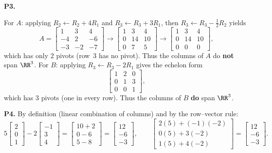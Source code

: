 \documentclass[10pt]{scrartcl}
\begin{document}
\begin{prob}\textbf{P3.}\par{}
\begin{steps}
  \ii For $A$: applying $R_2\leftarrow R_2+4R_1$ and $R_3\leftarrow R_3+3R_1$, then $R_3\leftarrow R_3-\tfrac12R_2$ yields
  \[
    A = \begin{bmatrix}1&3&4\\-4&2&-6\\-3&-2&-7\end{bmatrix}
    \to \begin{bmatrix}1&3&4\\0&14&10\\0&7&5\end{bmatrix}
    \to \begin{bmatrix}1&3&4\\0&14&10\\0&0&0\end{bmatrix},
  \]
  which has only $2$ pivots (row~3 has no pivot). Thus the columns of $A$ do \textbf{not} span $\RR^3$.
  \ii For $B$: applying $R_3\leftarrow R_3-2R_1$ gives the echelon form
  \[
    \begin{bmatrix}1&2&0\\0&1&3\\0&0&1\end{bmatrix},
  \]
  which has $3$ pivots (one in every row). Thus the columns of $B$ \textbf{do} span $\RR^3$.
\end{steps}
\end{prob}

\begin{prob}\textbf{P4.}
By definition (linear combination of columns) and by the row--vector rule:
\[
  5\begin{bmatrix}2\\0\\1\end{bmatrix}-2\begin{bmatrix}-1\\3\\4\end{bmatrix}=\begin{bmatrix}10+2\\0-6\\5-8\end{bmatrix}=\begin{bmatrix}12\\-6\\-3\end{bmatrix},
  \qquad
  \begin{bmatrix}2(5)+(-1)(-2)\\0(5)+3(-2)\\1(5)+4(-2)\end{bmatrix}=\begin{bmatrix}12\\-6\\-3\end{bmatrix}.
\]
\end{prob}
\end{document}
